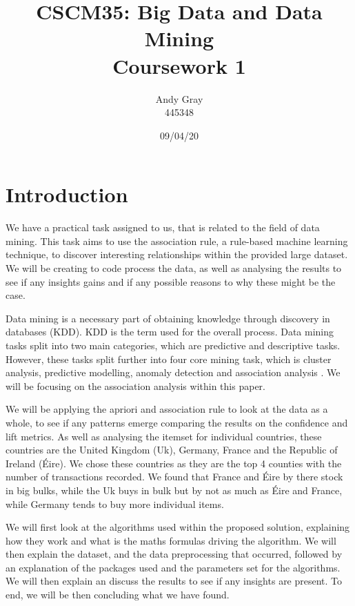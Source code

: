 \documentclass[a4paper,10pt]{article}
\begin{document}
\title{\textbf{CSCM35: Big Data and Data Mining \\Coursework 1}}
\date{09/04/20}
\author{Andy Gray\\445348}

\maketitle

\section{Introduction}

We have a practical task assigned to us, that is related to the field of data mining. This task aims to use the association rule, a rule-based machine learning technique, to discover interesting relationships within the provided large dataset. We will be creating to code process the data, as well as analysing the results to see if any insights gains and if any possible reasons to why these might be the case. 

Data mining is a necessary part of obtaining knowledge through discovery in databases (KDD). KDD is the term used for the overall process. Data mining tasks split into two main categories, which are predictive and descriptive tasks. However, these tasks split further into four core mining task, which is cluster analysis, predictive modelling, anomaly detection and association analysis \cite{tan2016introduction}. We will be focusing on the association analysis within this paper.

We will be applying the apriori and association rule to look at the data as a whole, to see if any patterns emerge comparing the results on the confidence and lift metrics. As well as analysing the itemset for individual countries, these countries are the United Kingdom (Uk), Germany, France and the Republic of Ireland (Éire). We chose these countries as they are the top 4 counties with the number of transactions recorded. We found that France and Éire by there stock in big bulks, while the Uk buys in bulk but by not as much as Éire and France, while Germany tends to buy more individual items.

We will first look at the algorithms used within the proposed solution, explaining how they work and what is the maths formulas driving the algorithm. We will then explain the dataset, and the data preprocessing that occurred, followed by an explanation of the packages used and the parameters set for the algorithms. We will then explain an discuss the results to see if any insights are present. To end, we will be then concluding what we have found.
\end{document}
